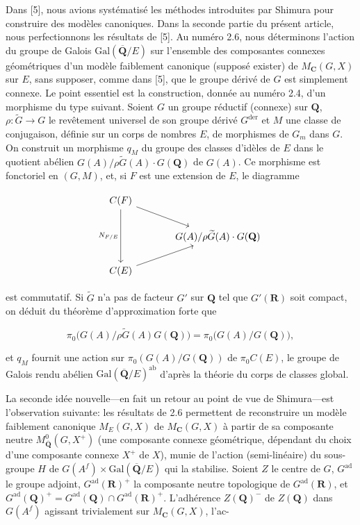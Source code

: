 \documentclass[10pt,a4paper]{article}
\begin{document}
Dans {[}5{]}, nous avions systématisé les méthodes introduites par Shimura pour construire des modèles canoniques. Dans la seconde partie du présent article, nous perfectionnons les résultats de {[}5{]}. Au numéro 2.6, nous déterminons l'action du groupe de Galois \(\mathrm{Gal}(\overline{\mathbf Q}/E)\) sur l'ensemble des composantes connexes géométriques d'un modèle faiblement canonique (supposé exister) de \(M_{\mathbf C}(G,X)\) sur \(E\), sans supposer, comme dans {[}5{]}, que le groupe dérivé de \(G\) est simplement connexe. Le point essentiel est la construction, donnée au numéro 2.4, d'un morphisme du type suivant. Soient \(G\) un groupe réductif (connexe) sur \(\mathbf Q\), \(\rho:\widetilde G\to G\) le revêtement universel de son groupe dérivé \(G^{\mathrm{der}}\) et \(M\) une classe de conjugaison, définie sur un corps de nombres \(E\), de morphismes de \(G_m\) dans \(G\). On construit un morphisme \(q_M\) du groupe des classes d'idèles de \(E\) dans le quotient abélien \(G(A)/\rho\widetilde G(A)\cdot G(\mathbf Q)\) de \(G(A)\). Ce morphisme est fonctoriel en \((G,M)\), et, si \(F\) est une extension de \(E\), le diagramme

\[
\begin{tikzcd}[column sep=large,row sep=normal]
C(F) \arrow[dd,"N_{F/E}"'] \arrow[dr] & \\
& G(A)/\rho\widetilde G(A)\cdot G(\mathbf Q) \\
C(E) \arrow[ur] &
\end{tikzcd}
\]

est commutatif. Si \(\widetilde G\) n'a pas de facteur \(G'\) sur \(\mathbf Q\) tel que \(G'(\mathbf R)\) soit compact, on déduit du théorème d'approximation forte que

\[
\pi_0\bigl(G(A)/\rho\widetilde G(A)G(\mathbf Q)\bigr)
=
\pi_0\bigl(G(A)/G(\mathbf Q)\bigr),
\]

et \(q_M\) fournit une action sur \(\pi_0(G(A)/G(\mathbf Q))\) de \(\pi_0C(E)\), le groupe de Galois rendu abélien \(\mathrm{Gal}(\overline{\mathbf Q}/E)^{\mathrm{ab}}\) d'après la théorie du corps de classes global.

La seconde idée nouvelle---en fait un retour au point de vue de Shimura---est l'observation suivante: les résultats de 2.6 permettent de reconstruire un modèle faiblement canonique \(M_E(G,X)\) de \(M_{\mathbf C}(G,X)\) à partir de sa composante neutre \(M^0_{\overline{\mathbf Q}}(G,X^+)\) (une composante connexe géométrique, dépendant du choix d'une composante connexe \(X^+\) de \(X\)), munie de l'action (semi-linéaire) du sous-groupe \(H\) de \(G(A^f)\times\mathrm{Gal}(\overline{\mathbf Q}/E)\) qui la stabilise. Soient \(Z\) le centre de \(G\), \(G^{\mathrm{ad}}\) le groupe adjoint, \(G^{\mathrm{ad}}(\mathbf R)^+\) la composante neutre topologique de \(G^{\mathrm{ad}}(\mathbf R)\), et \(G^{\mathrm{ad}}(\mathbf Q)^+=G^{\mathrm{ad}}(\mathbf Q)\cap G^{\mathrm{ad}}(\mathbf R)^+\). L'adhérence \(Z(\mathbf Q)^-\) de \(Z(\mathbf Q)\) dans \(G(A^f)\) agissant trivialement sur \(M_{\mathbf C}(G,X)\), l'ac-
\end{document}
